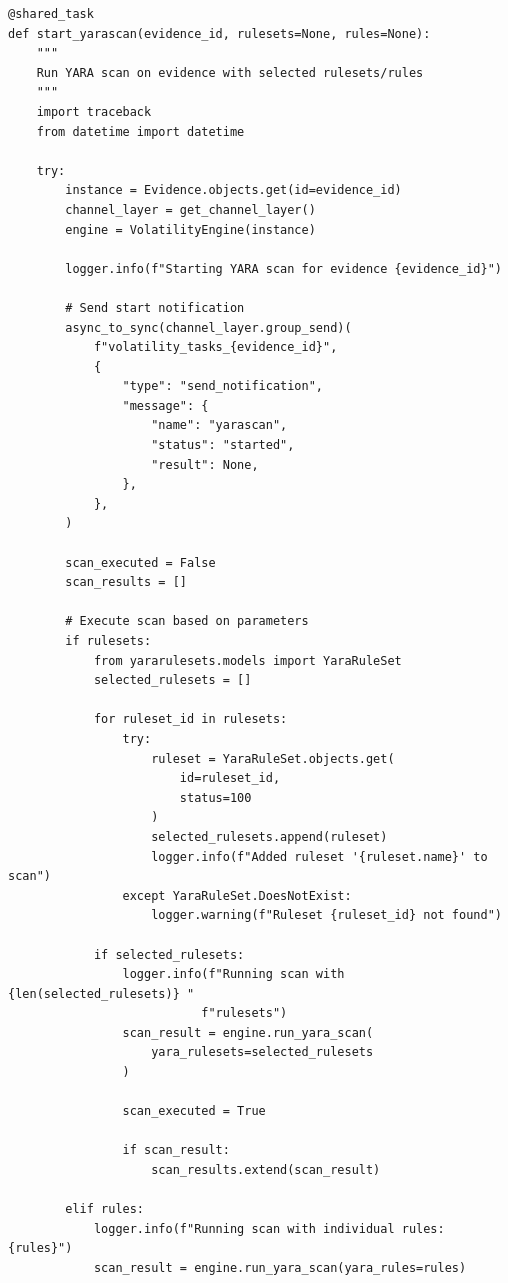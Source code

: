 \begin{verbatim}
@shared_task
def start_yarascan(evidence_id, rulesets=None, rules=None):
    """
    Run YARA scan on evidence with selected rulesets/rules
    """
    import traceback
    from datetime import datetime
    
    try:
        instance = Evidence.objects.get(id=evidence_id)
        channel_layer = get_channel_layer()
        engine = VolatilityEngine(instance)
        
        logger.info(f"Starting YARA scan for evidence {evidence_id}")
        
        # Send start notification
        async_to_sync(channel_layer.group_send)(
            f"volatility_tasks_{evidence_id}",
            {
                "type": "send_notification",
                "message": {
                    "name": "yarascan",
                    "status": "started",
                    "result": None,
                },
            },
        )
        
        scan_executed = False
        scan_results = []
        
        # Execute scan based on parameters
        if rulesets:
            from yararulesets.models import YaraRuleSet
            selected_rulesets = []
            
            for ruleset_id in rulesets:
                try:
                    ruleset = YaraRuleSet.objects.get(
                        id=ruleset_id, 
                        status=100
                    )
                    selected_rulesets.append(ruleset)
                    logger.info(f"Added ruleset '{ruleset.name}' to scan")
                except YaraRuleSet.DoesNotExist:
                    logger.warning(f"Ruleset {ruleset_id} not found")
            
            if selected_rulesets:
                logger.info(f"Running scan with {len(selected_rulesets)} "
                           f"rulesets")
                scan_result = engine.run_yara_scan(
                    yara_rulesets=selected_rulesets
                )
                
                scan_executed = True
                
                if scan_result:
                    scan_results.extend(scan_result)
                    
        elif rules:
            logger.info(f"Running scan with individual rules: {rules}")
            scan_result = engine.run_yara_scan(yara_rules=rules)
            

\end{verbatim}
